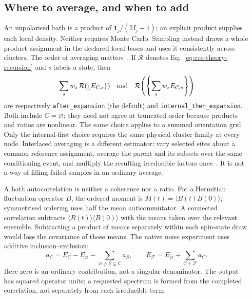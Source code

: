 \documentclass[11pt,a4paper]{article}
\newcommand{\code}[1]{\texttt{#1}}
\begin{document}
\subsection{Where to average, and when to add}

An unpolarised bath is a product of $\mathbf{1}_j/(2I_j+1)$; an explicit
product supplies each local density. Neither requires Monte Carlo.
Sampling instead draws a whole product assignment in the declared local
bases and uses it consistently across clusters. The order of averaging
matters~\cite{cce-theory-yang09}. If $\mathcal R$ denotes
Eq.~\eqref{eq:cce-theory-recursion} and $s$ labels a state, then
\begin{equation}
 \sum_s w_s\,\mathcal R(\{E_{C,s}\})\quad\hbox{and}\quad
 \mathcal R\!\left(\left\{\sum_s w_s E_{C,s}\right\}\right)
 \label{eq:cce-theory-averaging}
\end{equation}
are respectively \code{after\_expansion} (the default) and
\code{internal\_then\_expansion}. Both include $C=\varnothing$;
they need not agree at truncated order because products and ratios are
nonlinear. The same choice applies to a summed orientation grid. Only
the internal-first choice requires the same physical cluster family at
every node. Interlaced averaging is a different estimator: vary selected
sites about a common reference assignment, average the parent and its
subsets over the same conditioning event, and multiply the resulting
irreducible factors once~\cite{cce-theory-witzel12}. It is not a way of
filling failed samples in an ordinary average.

A bath autocorrelation is neither a coherence nor a ratio. For a Hermitian
fluctuation operator $B$, the ordered moment is
$M(t)=\langle B(t)B(0)\rangle$; symmetrised ordering uses half the mean
anticommutator. A connected correlation subtracts
$\langle B(t)\rangle\langle B(0)\rangle$ with the means taken over the
relevant ensemble. Subtracting a product of means separately within each
spin-state draw would lose the covariance of those means. The native
noise experiment uses additive inclusion--exclusion:
\begin{equation}
 a_C=E_C-E_\varnothing-\sum_{\varnothing\ne S\subsetneq C}a_S,
 \qquad E_{\mathcal F}=E_\varnothing+\sum_{C\in\mathcal F}a_C .
 \label{eq:cce-theory-additive}
\end{equation}
Here zero is an ordinary contribution, not a singular denominator. The
output has squared operator units; a requested spectrum is formed from
the completed correlation, not separately from each irreducible term.
\end{document}
